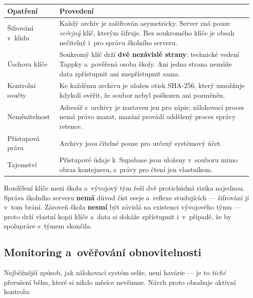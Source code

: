 \documentclass[11pt,a4paper]{article}
\begin{document}
\begin{center}
\begin{tabularx}{\textwidth}{@{}p{4.4cm}X@{}}
\toprule
\textbf{Opatření} & \textbf{Provedení} \\
\midrule
Šifrování v~klidu & Každý archiv je zašifrován asymetricky. Server zná pouze \emph{veřejný} klíč, kterým šifruje. Bez soukromého klíče je obsah nečitelný i~pro správu školního serveru. \\
Úschova klíče & Soukromý klíč drží \textbf{dvě nezávislé strany}: technické vedení Tappky a~pověřená osoba školy. Ani jedna strana nemůže data zpřístupnit ani znepřístupnit sama. \\
Kontrolní součty & Ke každému archivu je uložen otisk SHA-256, který umožňuje kdykoli ověřit, že soubor nebyl poškozen ani pozměněn. \\
Neměnitelnost & Adresář s~archivy je nastaven jen pro zápis; zálohovací proces nemá právo mazat, mazání provádí oddělený proces správy retence. \\
Přístupová práva & Archivy jsou čitelné pouze pro určený systémový účet. \\
Tajemství & Přístupové údaje k~Supabase jsou uloženy v~souboru mimo obraz kontejneru, s~právy pro čtení jen vlastníkem. \\
\bottomrule
\end{tabularx}
\end{center}

\begin{informace}
Rozdělení klíče mezi školu a~vývojový tým řeší dvě protichůdná rizika najednou. Správa školního
serveru \textbf{nemá} důvod číst eseje a~reflexe studujících --- šifrování jí v~tom brání. Zároveň
škola \textbf{nesmí} být závislá na existenci vývojového týmu --- proto drží vlastní kopii klíče
a~data si dokáže zpřístupnit i~v~případě, že by spolupráce s~týmem skončila.
\end{informace}

\subsection{Monitoring a~ověřování obnovitelnosti}
\label{sec:overovani}

Nejběžnější způsob, jak zálohovací systém selže, není havárie --- je to \emph{tiché} přerušení
běhu, které si nikdo měsíce nevšimne. Návrh proto obsahuje aktivní kontrolu:
\end{document}
